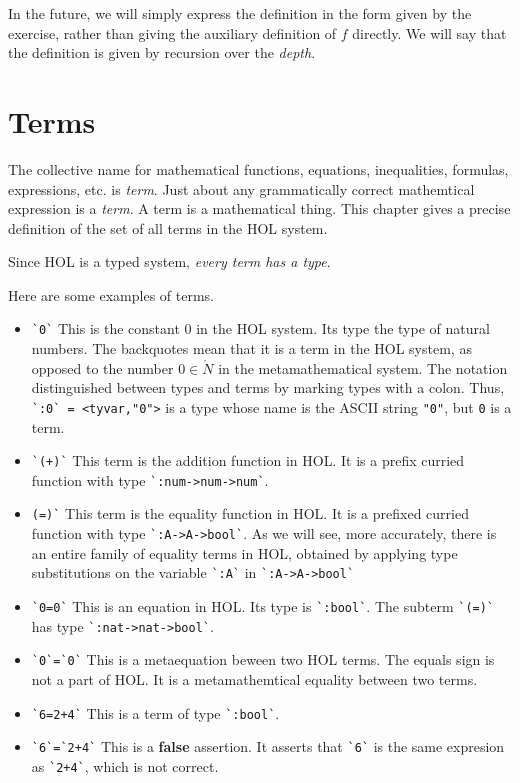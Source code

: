 In the future, we will simply express the definition in the form given by the exercise, rather than giving the auxiliary definition of $f$ directly.  We will say that the definition is given by recursion over the {\it depth}.


\chapter{Terms}

The collective name for mathematical functions, equations, inequalities, formulas, expressions, etc. is {\it term}.  Just about any grammatically correct mathemtical expression is a {\it term}.  A term is a mathematical thing.  This chapter gives a precise definition of the set of all terms in the HOL system.

Since HOL is a typed system, {\it every term has a type}.

\begin{example}
Here are some examples of terms.
\begin{itemize}
\item \verb!`0`!  This is the constant $0$ in the HOL system.  Its type the type of natural numbers.  The backquotes mean that it is a term in the HOL system, as opposed to the number $0\in\ring{N}$ in the metamathematical system.  The notation distinguished between types and terms by marking types with a colon.  Thus, \verb!`:0` = <tyvar,"0">! is a type whose name is the ASCII string \verb!"0"!, but \verb`0` is a term.
%
\item \verb!`(+)`!  This term is the addition function in HOL.  It is a prefix curried function with type \verb!`:num->num->num`!.
%
\item \verb!(=)`!  This term is the equality function in HOL.  It is a prefixed curried function with type \verb!`:A->A->bool`!.  As we will see, more accurately, there is an entire family of equality terms in HOL, obtained by applying type substitutions on the variable \verb!`:A`! in \verb!`:A->A->bool`!
%
\item \verb!`0=0`!  This is an equation in HOL.  Its type is \verb!`:bool`!.  The subterm \verb!`(=)`! has type \verb!`:nat->nat->bool`!.
%
\item \verb!`0`=`0`!  This is a metaequation beween two HOL terms.  The equals sign is not a part of HOL.  It is a metamathemtical equality between two terms.
%
\item \verb!`6=2+4`!  This is a term of type \verb!`:bool`!.
%
\item \verb!`6`=`2+4`!  This is a {\bf false} assertion.  It asserts that \verb!`6`! is the same expresion as \verb!`2+4`!, which is not correct.  
\end{itemize}
\end{example}

